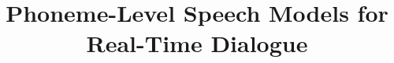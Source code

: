 \documentclass{article}
\begin{document}
\title{Phoneme-Level Speech Models for Real-Time Dialogue}
\maketitle


\end{document}
